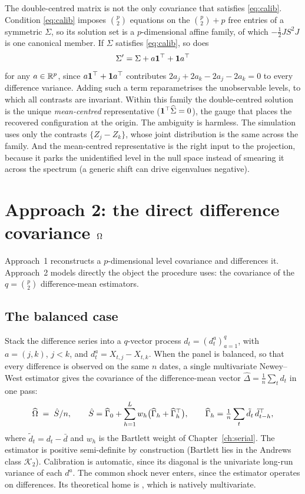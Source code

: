 The double-centred matrix is not the only covariance that satisfies \eqref{eq:calib}.
Condition \eqref{eq:calib} imposes $\binom{p}{2}$ equations on the $\binom{p}{2}+p$ free
entries of a symmetric $\Sigma$, so its solution set is a $p$-dimensional affine family,
of which $-\tfrac12 J S^2 J$ is one canonical member. If $\Sigma$ satisfies
\eqref{eq:calib}, so does
\begin{equation}
  \Sigma' = \Sigma + a\mathbf{1}^\top + \mathbf{1} a^\top
\end{equation}
for any $a\in\mathbb{R}^p$, since $a\mathbf{1}^\top + \mathbf{1} a^\top$ contributes
$2a_j+2a_k-2a_j-2a_k=0$ to every difference variance. Adding such a term reparametrises
the unobservable levels, to which all contrasts are invariant. Within this family the
double-centred solution is the unique \emph{mean-centred} representative
($\mathbf{1}^\top\widehat{\Sigma}=0$), the gauge that places the recovered configuration at the origin.
The ambiguity is harmless. The simulation uses only the contrasts $\{Z_j-Z_k\}$, whose
joint distribution is the same across the family. And the mean-centred representative is
the right input to the projection, because it parks the unidentified level in the null
space instead of smearing it across the spectrum (a generic shift can drive eigenvalues
negative).

\section{Approach 2: the direct difference covariance $\Omega$}
\label{sec:omega}

Approach~1 reconstructs a $p$-dimensional level covariance and differences it.
Approach~2 models directly the object the procedure uses: the covariance of the
$q=\binom{p}{2}$ difference-mean estimators.

\subsection{The balanced case}
\label{sec:omega-balanced}

Stack the difference series into a $q$-vector process $d_t = (d^a_t)_{a=1}^{q}$, with
$a=(j,k)$, $j<k$, and $d^a_t = X_{t,j}-X_{t,k}$. When the panel is balanced, so that
every difference is observed on the same $n$ dates, a single multivariate Newey--West
estimator gives the covariance of the difference-mean vector
$\hat\Delta = \tfrac1n\sum_t d_t$ in one pass:
\begin{equation}
  \widehat{\Omega} \;=\; \hat S/n,
  \qquad
  \hat S = \widehat{\Gamma}_0 + \sum_{h=1}^{L} w_h\big(\widehat{\Gamma}_h + \widehat{\Gamma}_h^\top\big),
  \qquad
  \widehat{\Gamma}_h = \tfrac1n\sum_t \tilde d_t\,\tilde d_{t-h}^\top,
  \label{eq:omega-balanced}
\end{equation}
where $\tilde d_t = d_t - \bar d$ and $w_h$ is the Bartlett weight of
Chapter~\ref{ch:serial}. The estimator is positive semi-definite by construction
(Bartlett lies in the Andrews class $\mathcal{K}_2$). Calibration is automatic, since its
diagonal is the univariate long-run variance of each $d^a$. The common shock never
enters, since the estimator operates on differences. Its theoretical home is
\citet{andrews1991}, which is natively multivariate.

